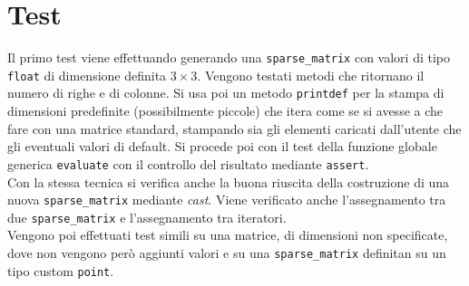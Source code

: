 \documentclass[a4paper,12pt, oneside]{article}
\begin{document}
\section*{Test}
Il primo test viene effettuando generando una \texttt{sparse\_matrix}
con valori di tipo \texttt{float} di dimensione definita $3\times
3$. Vengono testati metodi che ritornano il numero di righe e di
colonne. Si usa poi un metodo \texttt{printdef} per la stampa di
dimensioni predefinite (possibilmente piccole) che itera come se si
avesse a che fare con una matrice standard, stampando sia gli elementi
caricati dall'utente che gli eventuali valori di default. Si procede
poi con il test della funzione globale generica \texttt{evaluate} con
il controllo del risultato mediante \texttt{assert}.\\
Con la stessa tecnica si verifica anche la buona riuscita della
costruzione di una nuova \texttt{sparse\_matrix} mediante
\textit{cast}. Viene verificato anche l'assegnamento tra due
\texttt{sparse\_matrix} e l'assegnamento tra iteratori.\\
Vengono poi effettuati test simili su una matrice, di dimensioni non
specificate, dove non vengono però aggiunti valori e su una
\texttt{sparse\_matrix} definitan su un tipo custom \texttt{point}.
\end{document}
